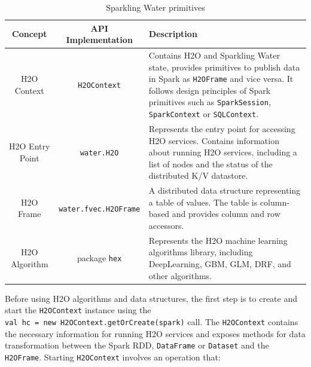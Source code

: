 \documentclass{standalone}
\begin{document}
\begin{table}[!ht]
	\centering
	\begin{tabular}{c c p{5.2cm}}
		\toprule
		Concept & API Implementation& Description \\
		\midrule
		H2O Context & \texttt{H2OContext} & Contains
		H2O and Sparkling Water state, provides primitives to publish data in Spark as \texttt{H2OFrame} and
		vice versa. It follows design principles of Spark primitives such as
		\texttt{SparkSession}, \texttt{SparkContext} or \texttt{SQLContext}. \\ \addlinespace

		H2O Entry Point & \texttt{water.H2O} & Represents the entry point for accessing
		H2O services. Contains information about running H2O services, including a list of
		nodes and the status of the distributed K/V datastore. \\  \addlinespace

		H2O Frame &  \small{\texttt{water.fvec.H2OFrame}} & A distributed data structure
		representing a table of values. The table is column-based and provides column and
		row accessors. \\  \addlinespace

		H2O Algorithm & package \texttt{hex} & Represents the H2O machine learning
		algorithms library, including DeepLearning, GBM, GLM, DRF, and other
		algorithms. \\

		\bottomrule
	\end{tabular}
	\caption{Sparkling Water primitives}
	\label{tab:primitives}
\end{table}

Before using H2O algorithms and data structures, the first step is to create and start the \texttt{H2OContext} instance using the \\
\texttt{val hc = new H2OContext.getOrCreate(spark)} call.
The \texttt{H2OContext} contains the necessary information for running H2O services and exposes methods for data transformation between the Spark RDD, \texttt{DataFrame} or \texttt{Dataset} and the \texttt{H2OFrame}.
Starting \texttt{H2OContext} involves an operation that:
\end{document}
